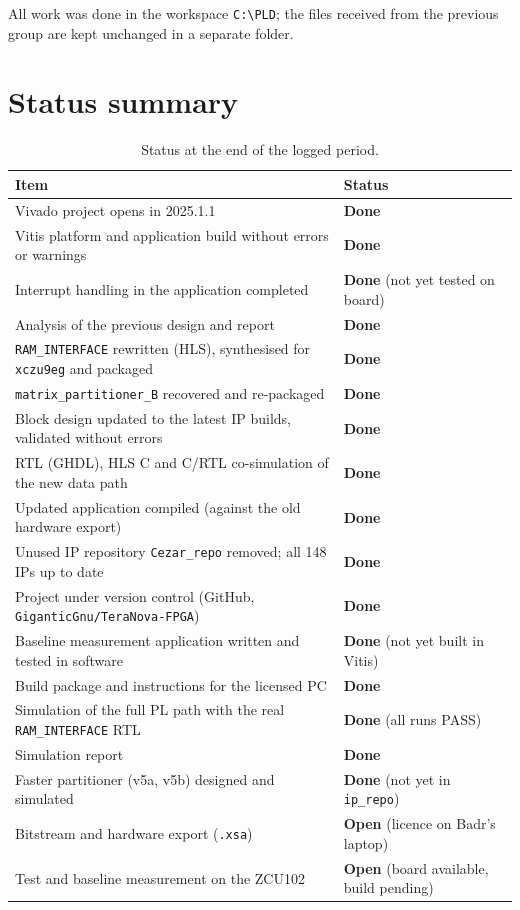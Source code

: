 \documentclass[11pt,a4paper]{article}
\newcommand{\code}[1]{\texttt{#1}}
\newcommand{\ok}{\textcolor{okgreen}{\textbf{Done}}}
\newcommand{\open}{\textcolor{warnorange}{\textbf{Open}}}
\begin{document}
All work was done in the workspace \code{C:\textbackslash PLD}; the files received from the previous group are kept unchanged in a separate folder.

\section{Status summary}
\begin{table}[H]
\centering
\begin{tabularx}{\textwidth}{@{}Yl@{}}
\toprule
\textbf{Item} & \textbf{Status} \\
\midrule
Vivado project opens in 2025.1.1 & \ok \\
Vitis platform and application build without errors or warnings & \ok \\
Interrupt handling in the application completed & \ok{} (not yet tested on board) \\
Analysis of the previous design and report & \ok \\
\code{RAM\_INTERFACE} rewritten (HLS), synthesised for \code{xczu9eg} and packaged & \ok \\
\code{matrix\_partitioner\_B} recovered and re-packaged & \ok \\
Block design updated to the latest IP builds, validated without errors & \ok \\
RTL (GHDL), HLS C and C/RTL co-simulation of the new data path & \ok \\
Updated application compiled (against the old hardware export) & \ok \\
Unused IP repository \code{Cezar\_repo} removed; all 148 IPs up to date & \ok \\
Project under version control (GitHub, \code{GiganticGnu/TeraNova-FPGA}) & \ok \\
Baseline measurement application written and tested in software & \ok{} (not yet built in Vitis) \\
Build package and instructions for the licensed PC & \ok \\
Simulation of the full PL path with the real \code{RAM\_INTERFACE} RTL & \ok{} (all runs PASS) \\
Simulation report & \ok \\
Faster partitioner (v5a, v5b) designed and simulated & \ok{} (not yet in \code{ip\_repo}) \\
Bitstream and hardware export (\code{.xsa}) & \open{} (licence on Badr's laptop) \\
Test and baseline measurement on the ZCU102 & \open{} (board available, build pending) \\
\bottomrule
\end{tabularx}
\caption{Status at the end of the logged period.}
\end{table}
\end{document}
